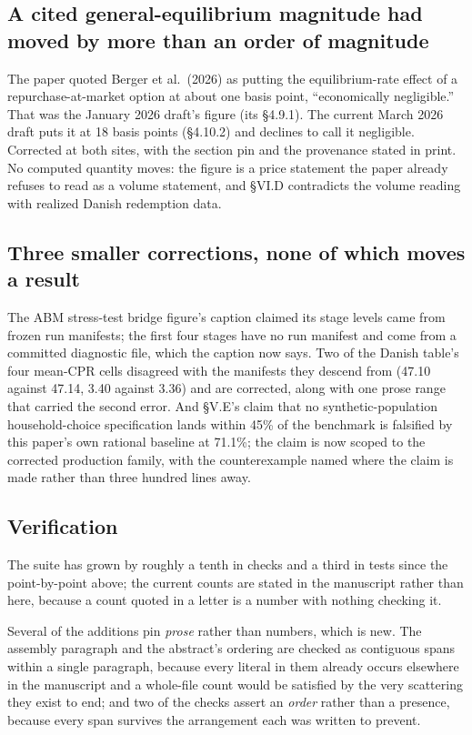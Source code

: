 \documentclass[11pt]{article}
\begin{document}
\subsection{A cited general-equilibrium magnitude had moved by more than an order of
magnitude}

The paper quoted Berger et al.\ (2026) as putting the equilibrium-rate effect of a
repurchase-at-market option at about one basis point, ``economically negligible.'' That
was the January 2026 draft's figure (its \S4.9.1). The current March 2026 draft puts it at
18 basis points (\S4.10.2) and declines to call it negligible. Corrected at both sites,
with the section pin and the provenance stated in print. No computed quantity moves: the
figure is a price statement the paper already refuses to read as a volume statement, and
\S VI.D contradicts the volume reading with realized Danish redemption data.

\subsection{Three smaller corrections, none of which moves a result}

The ABM stress-test bridge figure's caption claimed its stage levels came from frozen run
manifests; the first four stages have no run manifest and come from a committed
diagnostic file, which the caption now says. Two of the Danish table's four
mean-CPR cells disagreed with the manifests they descend from (47.10 against 47.14, 3.40
against 3.36) and are corrected, along with one prose range that carried the second
error. And \S V.E's claim that no synthetic-population household-choice specification
lands within 45\% of the benchmark is falsified by this paper's own rational baseline at
71.1\%; the claim is now scoped to the corrected production family, with the
counterexample named where the claim is made rather than three hundred lines away.

\subsection{Verification}

The suite has grown by roughly a tenth in checks and a third in tests since the
point-by-point above; the current counts are stated in the manuscript rather than
here, because a count quoted in a letter is a number with nothing checking it.

Several of the additions pin \emph{prose} rather than numbers, which is new. The
assembly paragraph and the abstract's ordering are checked as contiguous spans within
a single paragraph, because every literal in them already occurs elsewhere in the
manuscript and a whole-file count would be satisfied by the very scattering they exist
to end; and two of the checks assert an \emph{order} rather than a presence, because
every span survives the arrangement each was written to prevent.
\end{document}
